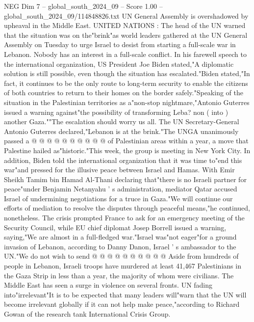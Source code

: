 \begin{textsample}{NEG Dim 7 – global\_south\_2024\_09 – Score 1.00 – global\_south\_2024\_09/114848826.txt}  \label{ex:f7_neg_229}
UN General Assembly is overshadowed by upheaval in the Middle East.
UNITED NATIONS : The head of the UN warned that the situation was on the"brink"as world leaders gathered at the UN General Assembly on Tuesday to urge Israel to desist from starting a full-scale war in Lebanon.
Nobody has an interest in a full-scale conflict.
In his farewell speech to the international organization, US President Joe Biden stated,"A diplomatic solution is still possible, even though the situation has escalated."Biden stated,"In fact, it continues to be the only route to long-term security to enable the citizens of both countries to return to their homes on the border safely."Speaking of the situation in the Palestinian territories as a"non-stop nightmare,"Antonio Guterres issued a warning against"the possibility of transforming Leba? non ( into ) another Gaza.""The escalation should worry us all.
The UN Secretary-General Antonio Guterres declared,"Lebanon is at the brink."The UNGA unanimously passed a @ @ @ @ @ @ @ @ @ @ of Palestinian areas within a year, a move that Palestine hailed as"historic."This week, the group is meeting in New York City.
In addition, Biden told the international organization that it was time to"end this war"and pressed for the illusive peace between Israel and Hamas.
With Emir Sheikh Tamim bin Hamad Al-Thani declaring that"there is no Israeli partner for peace"under Benjamin Netanyahu ' s administration, mediator Qatar accused Israel of undermining negotiations for a truce in Gaza."We will continue our efforts of mediation to resolve the disputes through peaceful means,"he continued, nonetheless.
The crisis prompted France to ask for an emergency meeting of the Security Council, while EU chief diplomat Josep Borrell issued a warning, saying,"We are almost in a full-fledged war."Israel was"not eager"for a ground invasion of Lebanon, according to Danny Danon, Israel ' s ambassador to the UN."We do not wish to send @ @ @ @ @ @ @ @ @ @ Aside from hundreds of people in Lebanon, Israeli troops have murdered at least 41,467 Palestinians in the Gaza Strip in less than a year, the majority of whom were civilians.
The Middle East has seen a surge in violence on several fronts.
UN fading into"irrelevant"It is to be expected that many leaders will"warn that the UN will become irrelevant globally if it can not help make peace,"according to Richard Gowan of the research tank International Crisis Group.

\end{textsample}
